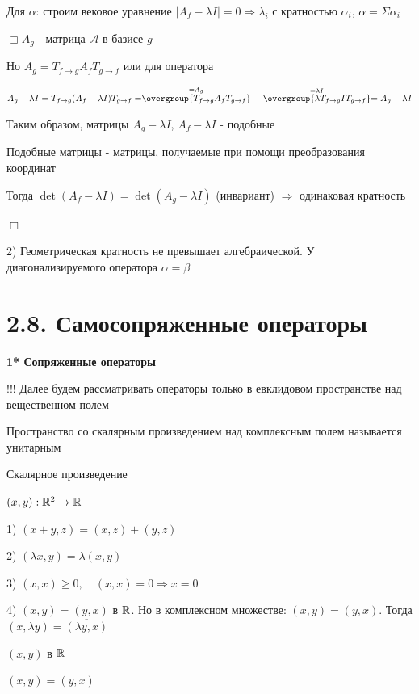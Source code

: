 \documentclass[12pt]{article}
\begin{document}
    Для $\alpha$: строим вековое уравнение $|A_f - \lambda I| = 0 \Longrightarrow \lambda_i$ с кратностью $\alpha_i$, $\alpha = \Sigma \alpha_i$

    $\sqsupset A_g$ - матрица $\mathcal{A}$ в базисе $g$

    Но $A_g = T_{f\to g} A_f T_{g\to f}$ или для оператора

    $A_g - \lambda I = T_{f\to g} (A_f - \lambda I) T_{g\to f} =
    \stackrel{= A_g}{\overgroup{T_{f\to g} A_f T_{g\to f}}} - \stackrel{= \lambda I}{\overgroup{\lambda T_{f\to g} I T_{g\to f}}} =
    A_g - \lambda I$

    Таким образом, матрицы $A_g - \lambda I$, $A_f - \lambda I$ - подобные

    \Def Подобные матрицы - матрицы, получаемые при помощи преобразования координат

    Тогда $\det (A_f - \lambda I) = \det (A_g - \lambda I)$ (инвариант) $\Longrightarrow$ одинаковая кратность

    $\Box$

    2) Геометрическая кратность не превышает алгебраической. У диагонализируемого оператора $\alpha = \beta$

    \section{2.8. Самосопряженные операторы}

    \textbf{1* Сопряженные операторы}

    !!! Далее будем рассматривать операторы только в евклидовом пространстве над вещественном полем

    Пространство со скалярным произведением над комплексным полем называется унитарным

    \Mem Скалярное произведение

    $(x, y) : \mathbb{R}^2 \rightarrow \mathbb{R}$

    1) $(x + y, z) = (x, z) + (y, z)$

    2) $(\lambda x, y) = \lambda (x, y)$

    3) $(x, x) \geq 0, \quad (x, x) = 0 \Longrightarrow x = 0$

    4) $(x, y) = (y, x)$ в $\mathbb{R}$. Но в комплексном множестве: $(x, y) = \overline{(y, x)}$. Тогда $(x, \lambda y) = \overline{(\lambda y, x)}$




    \Mem $(x, y)$ в $\mathbb{R}$

    $(x, y) = (y, x)$
\end{document}
